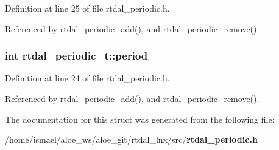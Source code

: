 Definition at line 25 of file rtdal\-\_\-periodic.\-h.



Referenced by rtdal\-\_\-periodic\-\_\-add(), and rtdal\-\_\-periodic\-\_\-remove().

\subsubsection[{period}]{\setlength{\rightskip}{0pt plus 5cm}int rtdal\-\_\-periodic\-\_\-t\-::period}\label{structrtdal__periodic__t_afe8337bd8b7d4b0abc130f9dfb723bf2}


Definition at line 24 of file rtdal\-\_\-periodic.\-h.



Referenced by rtdal\-\_\-periodic\-\_\-add(), and rtdal\-\_\-periodic\-\_\-remove().



The documentation for this struct was generated from the following file\-:\begin{DoxyCompactItemize}
\item 
/home/ismael/aloe\-\_\-ws/aloe\-\_\-git/rtdal\-\_\-lnx/src/{\bf rtdal\-\_\-periodic.\-h}\end{DoxyCompactItemize}
